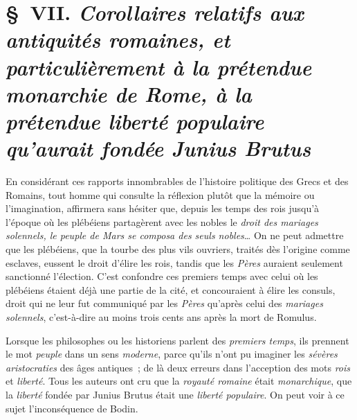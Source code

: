 \documentclass[french,twoside]{book} %
\begin{document}
\section[{§ VII. Corollaires relatifs aux antiquités romaines, et particulièrement à la prétendue monarchie de Rome, à la prétendue liberté populaire qu’aurait fondée Junius Brutus}]{§ VII. {\itshape Corollaires relatifs aux antiquités romaines, et particulièrement à la prétendue monarchie de Rome, à la prétendue liberté populaire qu’aurait fondée Junius Brutus}}
\noindent En considérant ces rapports innombrables de l’histoire politique des Grecs et des Romains, tout homme qui consulte la réflexion plutôt que la mémoire ou l’imagination, affirmera sans hésiter que,  depuis les temps des rois jusqu’à l’époque où les plébéiens partagèrent avec les nobles le {\itshape droit des mariages solennels, le peuple de Mars se composa des seuls nobles}… On ne peut admettre que les plébéiens, que la tourbe des plus vils ouvriers, traités dès l’origine comme esclaves, eussent le droit d’élire les rois, tandis que les {\itshape Pères} auraient seulement sanctionné l’élection. C’est confondre ces premiers temps avec celui où les plébéiens étaient déjà une partie de la cité, et concouraient à élire les consuls, droit qui ne leur fut communiqué par les {\itshape Pères} qu’après celui des {\itshape mariages solennels}, c’est-à-dire au moins trois cents ans après la mort de Romulus.\par
Lorsque les philosophes ou les historiens parlent des {\itshape premiers temps}, ils prennent le mot {\itshape peuple} dans un sens {\itshape moderne}, parce qu’ils n’ont pu imaginer les {\itshape sévères aristocraties} des âges antiques ; de là deux erreurs dans l’acception des mots {\itshape rois} et {\itshape liberté}. Tous les auteurs ont cru que la {\itshape royauté romaine} était {\itshape monarchique}, que la {\itshape liberté} fondée par Junius Brutus était une {\itshape liberté populaire}. On peut voir à ce sujet l’inconséquence de Bodin.\par
\end{document}

